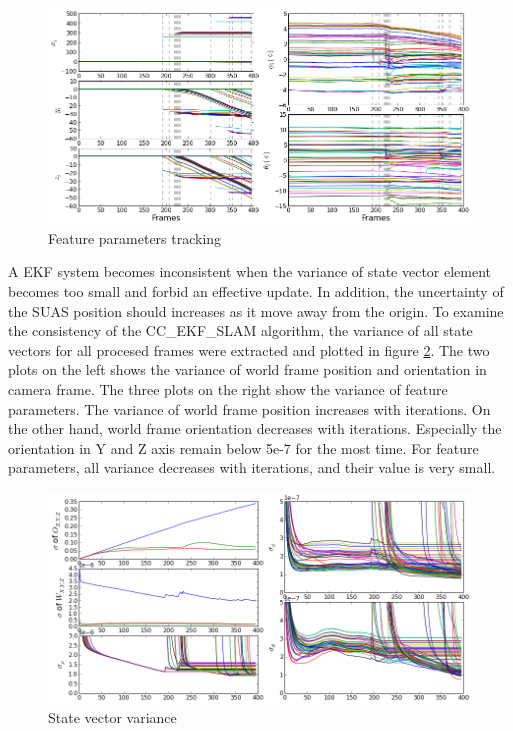 \begin{figure}[h]
\centering
\includegraphics[width=12cm, keepaspectratio=true]
{./Figures/fltfig/cut1/Figure20.png}
\caption{Feature parameters tracking}
\label{fltfig:2}
\end{figure}

A EKF system becomes inconsistent when the variance of state vector
element becomes too small and forbid an effective update. In addition,
the uncertainty of the SUAS position should increases as it move away
from the origin. To examine the consistency of the CC\_EKF\_SLAM
algorithm, the variance of all state vectors for all procesed frames
were extracted and plotted in figure \ref{fltfig:3}. The two plots on
the left shows the variance of world frame position and orientation in
camera frame. The three plots on the right show the variance of
feature parameters. The variance of world frame position increases
with iterations. On the other hand, world frame orientation decreases
with iterations. Especially the orientation in Y and Z axis remain
below 5e-7 for the most time. For feature parameters, all variance
decreases with iterations, and their value is very small. 
\begin{figure}[h]
\centering
\includegraphics[width=12cm, keepaspectratio=true]
{./Figures/fltfig/cut1/Figure40.png}
\caption{State vector variance}
\label{fltfig:3}
\end{figure}

